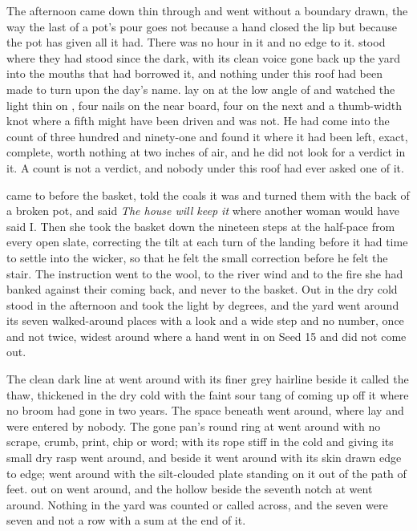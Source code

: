 The afternoon came down thin through  and went without a boundary drawn, the way the last of a pot's pour goes not because a hand closed the lip but because the pot has given all it had. There was no hour in it and no edge to it.  stood where they had stood since the dark,  with its clean voice gone back up the yard into the mouths that had borrowed it, and nothing under this roof had been made to turn upon the day's name.  lay on  at the low angle of  and watched the light thin on , four nails on the near board, four on the next and a thumb-width knot where a fifth might have been driven and was not. He had come into the count of three hundred and ninety-one and found it where it had been left, exact, complete, worth nothing at two inches of air, and he did not look for a verdict in it. A count is not a verdict, and nobody under this roof had ever asked one of it.

 came to  before the basket, told the coals it was  and turned them with the back of a broken pot, and said \emph{The house will keep it} where another woman would have said I. Then she took the basket down the nineteen steps at the half-pace from every open slate, correcting the tilt at each turn of the landing before it had time to settle into the wicker, so that he felt the small correction before he felt the stair. The instruction went to the wool, to the river wind and to the fire she had banked against their coming back, and never to the basket. Out in  the dry cold stood in the afternoon and took the light by degrees, and the yard went around its seven walked-around places with a look and a wide step and no number, once and not twice, widest around  where a hand went in on Seed 15 and did not come out.

The clean dark line at  went around with its finer grey hairline beside it called the thaw, thickened in the dry cold with the faint sour tang of  coming up off it where no broom had gone in two years. The space beneath  went around, where  lay and were entered by nobody. The gone pan's round ring at  went around with no scrape, crumb, print, chip or word;  with its rope stiff in the cold and giving its small dry rasp went around, and  beside it went around with its skin drawn edge to edge;  went around with the silt-clouded plate standing on it out of the path of feet.  out on  went around, and the hollow beside the seventh notch at  went around. Nothing in the yard was counted or called across, and the seven were seven and not a row with a sum at the end of it.

